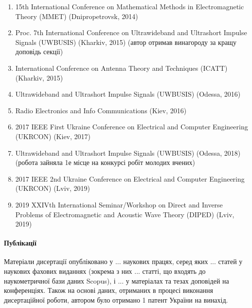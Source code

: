 \begin{enumerate}

	\item 15th International Conference on Mathematical Methods in 
	Electromagnetic Theory (MMET) (Dnipropetrovsk, 2014)

	\item Proc. 7th International Conference on Ultrawideband and 
	Ultrashort Impulse Signals (UWBUSIS) (Kharkiv, 2015) (автор отримав 
	винагороду за кращу доповідь секції)

	\item International Conference on Antenna Theory and Techniques
	(ICATT) (Kharkiv, 2015)

	\item Ultrawideband and Ultrashort Impulse Signals 
	(UWBUSIS) (Odessa, 2016)

	\item Radio Electronics and Info Communications (Kiev, 2016)

	\item 2017 IEEE First Ukraine Conference on Electrical and Computer 
	Engineering (UKRCON) (Kiev, 2017)

	\item Ultrawideband and Ultrashort Impulse Signals (UWBUSIS) 
	(Odessa, 2018) (робота зайняла 1е місце на конкурсі робіт молодих вчених)

	\item 2017 IEEE 2nd Ukraine Conference on Electrical and Computer 
	Engineering (UKRCON) (Lviv, 2019)

	\item 2019 XXIVth International Seminar/Workshop on Direct and Inverse
	Problems of Electromagnetic and Acoustic Wave Theory (DIPED) (Lviv, 2019)
\end{enumerate} 

\paragraph{Публікації}

Матеріали дисертації опубліковано у ... наукових працях, серед яких ... 
статей у наукових фахових виданнях (зокрема з них ... статті, що входять до 
наукометричної бази даних Scopus), і ... у матеріалах та тезах доповідей на 
конференціях. Також на основі даних, отриманих в процесі виконання 
дисертаційної роботи, автором було отримано 1 патент України на винахід.

